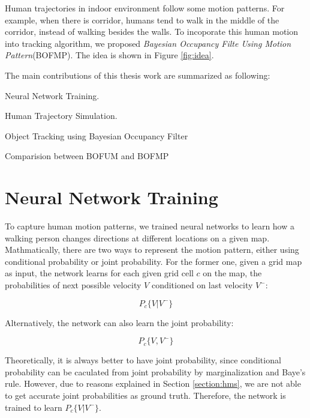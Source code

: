 Human trajectories in indoor environment follow some motion patterns. For example, when there is corridor, humans tend to walk in the middle of the corridor, instead of walking besides the walls. To incoporate this human motion into tracking algorithm, we proposed \textit{Bayesian Occupancy Filte Using Motion Pattern}(BOFMP). The idea is shown in Figure \ref{fig:idea}.

The main contributions of this thesis work are summarized as following:

\begin{my_enumerate}
\item Neural Network Training.
\item Human Trajectory Simulation.
\item Object Tracking using Bayesian Occupancy Filter
\item Comparision between BOFUM and BOFMP
\end{my_enumerate}

\section{ Neural Network Training}  To capture  human motion patterns, we trained neural networks to learn how a walking person changes directions at different locations on a given map. Mathmatically, there are two ways to represent the motion pattern, either using conditional probability or joint probability. For the former one, given a grid map as input, the network learns for each given grid cell \( c \) on the map, the probabilities of next possible velocity \( V \) conditioned on last velocity \( V^- \):

\[ P_c\{V | V^-\} \] 

Alternatively, the network can also learn the joint probability:

\[ P_c\{V , V^-\} \]

Theoretically, it is always better to have joint probability, since conditional probability can be caculated from joint probability by marginalization and Baye's rule. However, due to reasons explained in Section \ref{section:hms}, we are not able to get accurate joint probabilities as ground truth. Therefore, the network is trained to learn \( P_c\{V | V^-\} \). 

